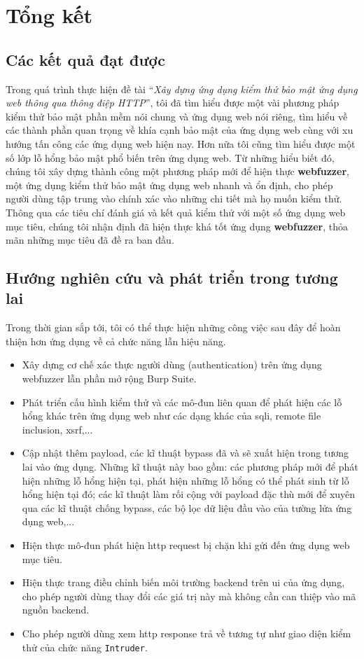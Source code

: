 \chapter{Tổng kết}
\section{Các kết quả đạt được}
Trong quá trình thực hiện đề tài ``\textit{Xây dựng ứng dụng kiểm thử bảo mật ứng dụng web thông qua thông điệp HTTP}'', tôi đã tìm hiểu được một vài phương pháp kiểm thử bảo mật phần mềm nói chung và ứng dụng web nói riêng, tìm hiểu về các thành phần quan trọng về khía cạnh bảo mật của ứng dụng web cùng với xu hướng tấn công các ứng dụng web hiện nay. Hơn nữa tôi cũng tìm hiểu được một số lớp lỗ hổng bảo mật phổ biến trên ứng dụng web. Từ những hiểu biết đó, chúng tôi xây dựng thành công một phương pháp mới để hiện thực \textbf{webfuzzer}, một ứng dụng kiểm thử bảo mật ứng dụng web nhanh và ổn định, cho phép người dùng tập trung vào chính xác vào những chi tiết mà họ muốn kiểm thử. Thông qua các tiêu chí đánh giá và kết quả kiểm thử với một số ứng dụng web mục tiêu, chúng tôi nhận định đã hiện thực khá tốt ứng dụng \textbf{webfuzzer}, thỏa mãn những mục tiêu đã đề ra ban đầu.

\section{Hướng nghiên cứu và phát triển trong tương lai}
Trong thời gian sắp tới, tôi có thể thực hiện những công việc sau đây để hoàn thiện hơn ứng dụng về cả chức năng lẫn hiệu năng.
\begin{itemize}
    \item Xây dựng cơ chế xác thực người dùng (authentication) trên ứng dụng webfuzzer lẫn phần mở rộng Burp Suite.
    \item Phát triển cấu hình kiểm thử và các mô-đun liên quan để phát hiện các lỗ hổng khác trên ứng dụng web như các dạng khác của \acrshort{sqli}, remote file inclusion, \acrshort{xsrf},...
    \item Cập nhật thêm payload, các kĩ thuật bypass đã và sẽ xuất hiện trong tương lai vào ứng dụng. Những kĩ thuật này bao gồm: các phương pháp mới để phát hiện những lỗ hổng hiện tại, phát hiện những lỗ hổng có thể phát sinh từ lỗ hổng hiện tại đó; các kĩ thuật làm rối cộng với payload đặc thù mới để xuyên qua các kĩ thuật chống bypass, các bộ lọc dữ liệu đầu vào của tường lửa ứng dụng web,...
    \item Hiện thực mô-đun phát hiện \acrshort{http} request bị chặn khi gửi đến ứng dụng web mục tiêu.
    \item Hiện thực trang điều chỉnh biến môi trường backend trên \acrshort{ui} của ứng dụng, cho phép người dùng thay đổi các giá trị này mà không cần can thiệp vào mã nguồn backend.
    \item Cho phép người dùng xem \acrshort{http} response trả về tương tự như giao diện kiểm thử của chức năng \texttt{Intruder}.
\end{itemize}